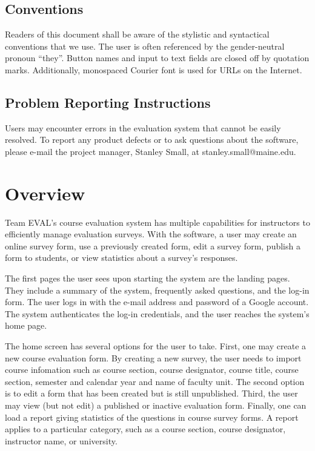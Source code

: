 \documentclass{article}
\begin{document}
\subsection{Conventions}

Readers of this document shall be aware of the stylistic and syntactical conventions that we use. The user is often referenced by the gender-neutral pronoun ``they''. Button names and input to text fields are closed off by quotation marks. Additionally, monospaced Courier font is used for URLs on the Internet.

\subsection{Problem Reporting Instructions}

Users may encounter errors in the evaluation system that cannot be easily resolved. To report any product defects or to ask questions about the software, please e-mail the project manager, Stanley Small, at stanley.small@maine.edu.

\section{Overview}

Team EVAL's course evaluation system has multiple capabilities for instructors to efficiently manage evaluation surveys. With the software, a user may create an online survey form, use a previously created form, edit a survey form, publish a form to students, or view statistics about a survey's responses.

The first pages the user sees upon starting the system are the landing pages. They include a summary of the system, frequently asked questions, and the log-in form. The user logs in with the e-mail address and password of a Google account. The system authenticates the log-in credentials, and the user reaches the system's home page.

The home screen has several options for the user to take. First, one may create a new course evaluation form. By creating a new survey, the user needs to import course infomation such as course section, course designator, course title, course section, semester and calendar year and name of faculty unit. The second option is to edit a form that has been created but is still unpublished. Third, the user may view (but not edit) a published or inactive evaluation form. Finally, one can load a report giving statistics of the questions in course survey forms. A report applies to a particular category, such as a course section, course designator, instructor name, or university.
\end{document}
